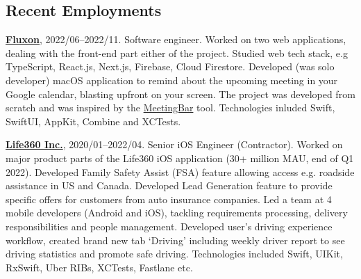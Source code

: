 \documentclass{nk-resume}
\begin{document}

\subsection*{Recent Employments}

\textbf{\href{https://www.fluxon.com/}{Fluxon}}, 2022/06--2022/11.
Software engineer.
\newline Worked on two web applications, dealing with the front-end part either of the project.
Studied web tech stack, e.g TypeScript, React.js, Next.js, Firebase, Cloud Firestore.
\newline Developed (was solo developer) macOS application to remind about the upcoming meeting 
in your Google calendar, blasting upfront on your screen. The project was developed from scratch and 
was inspired by the \href{https://github.com/leits/MeetingBar}{MeetingBar} tool.
Technologies inluded Swift, SwiftUI, AppKit, Combine and XCTests.

\vspace*{14px}

\textbf{\href{https://www.life360.com}{Life360 Inc.}}, 2020/01--2022/04. 
Senior iOS Engineer (Contractor).
\newline Worked on major product parts of the Life360 iOS application 
(30+ million MAU, end of Q1 2022). Developed Family Safety Assist (FSA) feature allowing access 
e.g. roadside assistance in US and Canada. Developed Lead Generation feature to provide specific offers 
for customers from auto insurance companies. Led a team at 4 mobile developers (Android and iOS), 
tackling requirements processing, delivery responsibilities and people management. Developed user's 
driving experience workflow, created brand new tab ‘Driving’ including weekly driver report 
to see driving statistics and promote safe driving.\newline
Technologies included Swift, UIKit, RxSwift, Uber RIBs, XCTests, Fastlane etc.

\vspace*{14px}
\end{document}
